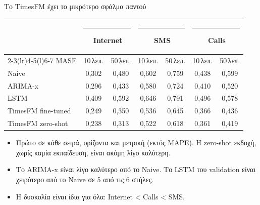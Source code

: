 \documentclass[aspectratio=169,10pt]{beamer}
\newcommand{\muted}[1]{\textcolor{muted}{#1}}
\newcommand{\ser}[2]{\textcolor{#1}{\rule[0.05em]{0.6em}{0.6em}}\,#2}
\newcommand{\sInet}{\ser{inet}{Internet}}
\newcommand{\sSms}{\ser{sms}{SMS}}
\newcommand{\sCalls}{\ser{calls}{Calls}}
\begin{document}
\begin{frame}{Το TimesFM έχει το μικρότερο σφάλμα παντού}
  \centering
  \small
  \begin{tabular}{@{}lcccccc@{}}
    \toprule
    & \multicolumn{2}{c}{\sInet} & \multicolumn{2}{c}{\sSms} & \multicolumn{2}{c}{\sCalls} \\
    \cmidrule(lr){2-3}\cmidrule(lr){4-5}\cmidrule(l){6-7}
    MASE & 10\,λεπ. & 50\,λεπ. & 10\,λεπ. & 50\,λεπ. & 10\,λεπ. & 50\,λεπ. \\
    \midrule
    Naive               & 0,302 & 0,480 & 0,602 & 0,759 & 0,438 & 0,599 \\
    ARIMA-x             & 0,296 & 0,433 & 0,580 & 0,724 & 0,410 & 0,520 \\
    LSTM                & 0,409 & 0,592 & 0,646 & 0,791 & 0,496 & 0,578 \\
    TimesFM fine-tuned  & \alert{0,249} & \alert{0,350} & \alert{0,536} & \alert{0,645} & \alert{0,366} & \alert{0,436} \\
    \midrule
    \muted{TimesFM zero-shot} & \muted{0,238} & \muted{0,313} & \muted{0,522} & \muted{0,618} & \muted{0,361} & \muted{0,419} \\
    \bottomrule
  \end{tabular}

  \vspace{0.6em}
  \raggedright\normalsize
  \begin{itemize}
    \item Πρώτο σε κάθε σειρά, ορίζοντα και μετρική (εκτός MAPE). Η zero-shot εκδοχή, \alert{χωρίς καμία εκπαίδευση}, είναι ακόμη λίγο καλύτερη.
    \item Το ARIMA-x είναι λίγο καλύτερο από το Naive. Το LSTM του validation είναι \alert{χειρότερο από το Naive} σε 5 από τις 6 στήλες.
    \item Η δυσκολία είναι ίδια για όλα: Internet < Calls < SMS.
  \end{itemize}
\end{frame}
\end{document}
